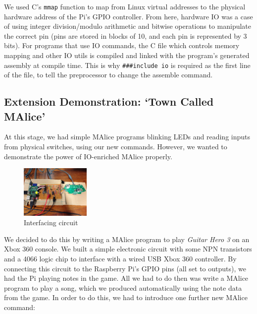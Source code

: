 \documentclass[11pt, notitlepage]{report}
\begin{document}
We used C's \texttt{mmap} function to map from Linux virtual addresses to the physical hardware address of the Pi's GPIO controller. From here, hardware IO was a case of using integer division/modulo arithmetic and bitwise operations to manipulate the correct pin (pins are stored in blocks of 10, and each pin is represented by 3 bits). For programs that use IO commands, the C file which controls memory mapping and other IO utils is compiled and linked with the program's generated assembly at compile time. This is why \texttt{\#\#\#include io} is required as the first line of the file, to tell the preprocessor to change the assemble command.

\subsection*{Extension Demonstration: `Town Called MAlice'}

At this stage, we had simple MAlice programs blinking LEDs and reading inputs from physical switches, using our new commands. However, we wanted to demonstrate the power of IO-enriched MAlice properly.

\begin{figure}
  \vspace{-20pt}
  \begin{center}
    \includegraphics[width=0.3\textwidth]{IMG_9457.JPG}
    \caption{Interfacing circuit}
  \end{center}
  \vspace{-10pt}
\end{figure}

We decided to do this by writing a MAlice program to play \emph{Guitar Hero 3} on an Xbox 360 console. We built a simple electronic circuit with some NPN transistors and a 4066 logic chip to interface with a wired USB Xbox 360 controller. By connecting this circuit to the Raspberry Pi's GPIO pins (all set to outputs), we had the Pi playing notes in the game. All we had to do then was write a MAlice program to play a song, which we produced automatically using the note data from the game. In order to do this, we had to introduce one further new MAlice command:
\end{document}
